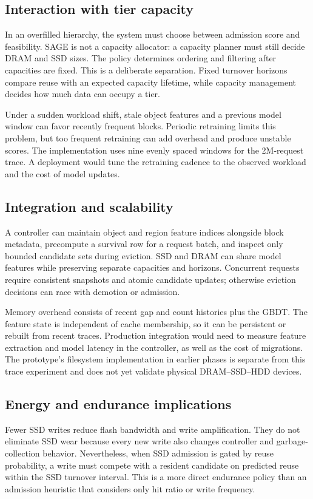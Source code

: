 \documentclass[conference]{IEEEtran}
\begin{document}
\begin{table}[t]
\subsection{Interaction with tier capacity}
In an overfilled hierarchy, the system must choose between admission score and feasibility. SAGE is not a capacity allocator: a capacity planner must still decide DRAM and SSD sizes. The policy determines ordering and filtering after capacities are fixed. This is a deliberate separation. Fixed turnover horizons compare reuse with an expected capacity lifetime, while capacity management decides how much data can occupy a tier.

Under a sudden workload shift, stale object features and a previous model window can favor recently frequent blocks. Periodic retraining limits this problem, but too frequent retraining can add overhead and produce unstable scores. The implementation uses nine evenly spaced windows for the 2M-request trace. A deployment would tune the retraining cadence to the observed workload and the cost of model updates.

\subsection{Integration and scalability}
A controller can maintain object and region feature indices alongside block metadata, precompute a survival row for a request batch, and inspect only bounded candidate sets during eviction. SSD and DRAM can share model features while preserving separate capacities and horizons. Concurrent requests require consistent snapshots and atomic candidate updates; otherwise eviction decisions can race with demotion or admission.

Memory overhead consists of recent gap and count histories plus the GBDT. The feature state is independent of cache membership, so it can be persistent or rebuilt from recent traces. Production integration would need to measure feature extraction and model latency in the controller, as well as the cost of migrations. The prototype's filesystem implementation in earlier phases is separate from this trace experiment and does not yet validate physical DRAM--SSD--HDD devices.

\subsection{Energy and endurance implications}
Fewer SSD writes reduce flash bandwidth and write amplification. They do not eliminate SSD wear because every new write also changes controller and garbage-collection behavior. Nevertheless, when SSD admission is gated by reuse probability, a write must compete with a resident candidate on predicted reuse within the SSD turnover interval. This is a more direct endurance policy than an admission heuristic that considers only hit ratio or write frequency.


\end{table}
\end{document}

